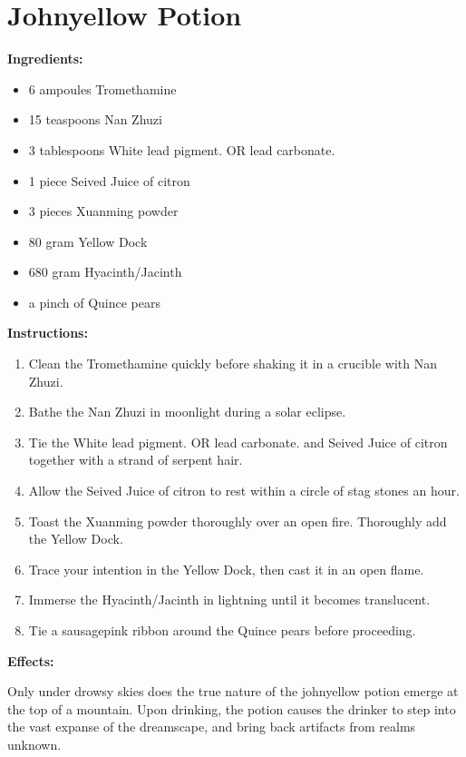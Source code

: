\documentclass{article}
\begin{document}
\newpage
\section*{Johnyellow Potion}

\textbf{Ingredients:}

\begin{itemize}
  \item 6 ampoules Tromethamine
  \item 15 teaspoons Nan Zhuzi
  \item 3 tablespoons White lead pigment. OR lead carbonate.
  \item 1 piece Seived Juice of citron
  \item 3 pieces Xuanming powder
  \item 80 gram Yellow Dock
  \item 680 gram Hyacinth/Jacinth
  \item a pinch of Quince pears
\end{itemize}

\textbf{Instructions:}

\begin{enumerate}
  \item Clean the Tromethamine quickly before shaking it in a crucible with Nan Zhuzi.
  \item Bathe the Nan Zhuzi in moonlight during a solar eclipse.
  \item Tie the White lead pigment. OR lead carbonate. and Seived Juice of citron together with a strand of serpent hair.
  \item Allow the Seived Juice of citron to rest within a circle of stag stones an hour.
  \item Toast the Xuanming powder thoroughly over an open fire. Thoroughly add the Yellow Dock.
  \item Trace your intention in the Yellow Dock, then cast it in an open flame.
  \item Immerse the Hyacinth/Jacinth in lightning until it becomes translucent.
  \item Tie a sausagepink ribbon around the Quince pears before proceeding.
\end{enumerate}

\textbf{Effects:}

Only under drowsy skies does the true nature of the johnyellow potion emerge at the top of a mountain. Upon drinking, the potion causes the drinker to step into the vast expanse of the dreamscape, and bring back artifacts from realms unknown.
\end{document}
